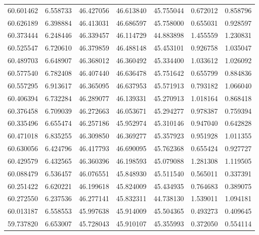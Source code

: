 \begin{tabular}{rrrrrrr}
 60.601462 &   6.558733 &         46.427056 &         46.613840 &         45.755044 &  0.672012 &  0.858796 \\
 60.626189 &   6.398884 &         46.413031 &         46.686597 &         45.758000 &  0.655031 &  0.928597 \\
 60.373444 &   6.248446 &         46.339457 &         46.114729 &         44.883898 &  1.455559 &  1.230831 \\
 60.525547 &   6.720610 &         46.379859 &         46.488148 &         45.453101 &  0.926758 &  1.035047 \\
 60.489703 &   6.648907 &         46.368012 &         46.360492 &         45.334400 &  1.033612 &  1.026092 \\
 60.577540 &   6.782408 &         46.407440 &         46.636478 &         45.751642 &  0.655799 &  0.884836 \\
 60.557295 &   6.913617 &         46.365095 &         46.637953 &         45.571913 &  0.793182 &  1.066040 \\
 60.406394 &   6.732284 &         46.289077 &         46.139331 &         45.270913 &  1.018164 &  0.868418 \\
 60.376458 &   6.709039 &         46.272663 &         46.053671 &         45.294277 &  0.978387 &  0.759394 \\
 60.335496 &   6.655474 &         46.257186 &         45.952974 &         45.310146 &  0.947040 &  0.642828 \\
 60.471018 &   6.835255 &         46.309850 &         46.369277 &         45.357923 &  0.951928 &  1.011355 \\
 60.630056 &   6.424796 &         46.417793 &         46.690095 &         45.762368 &  0.655424 &  0.927727 \\
 60.429579 &   6.432565 &         46.360396 &         46.198593 &         45.079088 &  1.281308 &  1.119505 \\
 60.088479 &   6.536457 &         46.076551 &         45.848930 &         45.511540 &  0.565011 &  0.337391 \\
 60.251422 &   6.620221 &         46.199618 &         45.824009 &         45.434935 &  0.764683 &  0.389075 \\
 60.272550 &   6.237536 &         46.277141 &         45.832311 &         44.738130 &  1.539011 &  1.094181 \\
 60.013187 &   6.558553 &         45.997638 &         45.914009 &         45.504365 &  0.493273 &  0.409645 \\
 59.737820 &   6.653007 &         45.728043 &         45.910107 &         45.355993 &  0.372050 &  0.554114 \\

\end{tabular}
